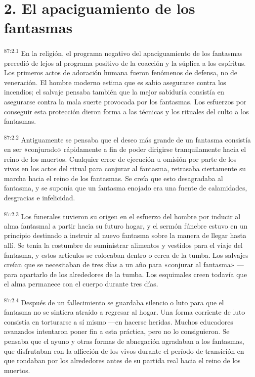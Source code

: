 \section*{2. El apaciguamiento de los fantasmas}
\par
\textsuperscript{87:2.1} En la religión, el programa negativo del apaciguamiento de los fantasmas precedió de lejos al programa positivo de la coacción y la súplica a los espíritus. Los primeros actos de adoración humana fueron fenómenos de defensa, no de veneración. El hombre moderno estima que es sabio asegurarse contra los incendios; el salvaje pensaba también que la mejor sabiduría consistía en asegurarse contra la mala suerte provocada por los fantasmas. Los esfuerzos por conseguir esta protección dieron forma a las técnicas y los rituales del culto a los fantasmas.

\par
\textsuperscript{87:2.2} Antiguamente se pensaba que el deseo más grande de un fantasma consistía en ser «conjurado» rápidamente a fin de poder dirigirse tranquilamente hacia el reino de los muertos. Cualquier error de ejecución u omisión por parte de los vivos en los actos del ritual para conjurar al fantasma, retrasaba ciertamente su marcha hacia el reino de los fantasmas. Se creía que esto desagradaba al fantasma, y se suponía que un fantasma enojado era una fuente de calamidades, desgracias e infelicidad.

\par
\textsuperscript{87:2.3} Los funerales tuvieron su origen en el esfuerzo del hombre por inducir al alma fantasmal a partir hacia su futuro hogar, y el sermón fúnebre estuvo en un principio destinado a instruir al nuevo fantasma sobre la manera de llegar hasta allí. Se tenía la costumbre de suministrar alimentos y vestidos para el viaje del fantasma, y estos artículos se colocaban dentro o cerca de la tumba. Los salvajes creían que se necesitaban de tres días a un año para «conjurar al fantasma» ---para apartarlo de los alrededores de la tumba. Los esquimales creen todavía que el alma permanece con el cuerpo durante tres días.

\par
\textsuperscript{87:2.4} Después de un fallecimiento se guardaba silencio o luto para que el fantasma no se sintiera atraído a regresar al hogar. Una forma corriente de luto consistía en torturarse a sí mismo ---en hacerse heridas. Muchos educadores avanzados intentaron poner fin a esta práctica, pero no lo consiguieron. Se pensaba que el ayuno y otras formas de abnegación agradaban a los fantasmas, que disfrutaban con la aflicción de los vivos durante el período de transición en que rondaban por los alrededores antes de su partida real hacia el reino de los muertos.

